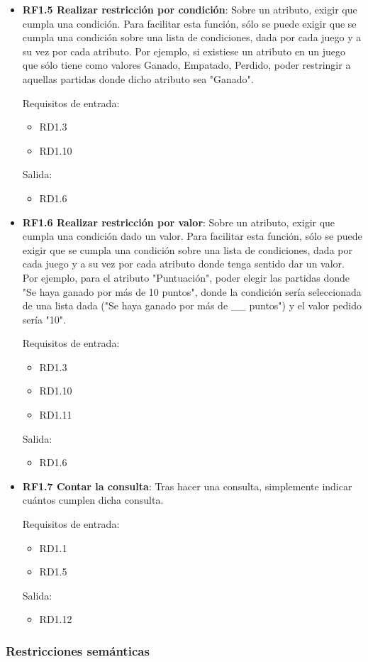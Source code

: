 \begin{itemize}
	
	\item \textbf{RF1.5 Realizar restricción por condición}: Sobre un atributo, exigir que cumpla una condición. Para facilitar esta función, sólo se puede exigir que se cumpla una condición sobre una lista de condiciones, dada por cada juego y a su vez por cada atributo. Por ejemplo, si existiese un atributo en un juego que sólo tiene como valores {Ganado, Empatado, Perdido}, poder restringir a aquellas partidas donde dicho atributo sea "Ganado".
	
	Requisitos de entrada:
	\begin{itemize}
		\item RD1.3
		\item RD1.10
	\end{itemize}
	Salida:
	\begin{itemize}
		\item RD1.6
	\end{itemize}
	
	
	\item \textbf{RF1.6 Realizar restricción por valor}: Sobre un atributo, exigir que cumpla una condición dado un valor. Para facilitar esta función, sólo se puede exigir que se cumpla una condición sobre una lista de condiciones, dada por cada juego y a su vez por cada atributo donde tenga sentido dar un valor. Por ejemplo, para el atributo "Puntuación", poder elegir las partidas donde "Se haya ganado por más de 10 puntos", donde la condición sería seleccionada de una lista dada ("Se haya ganado por más de \_\_ puntos") y el valor pedido sería "10".
	
	Requisitos de entrada:
	\begin{itemize}
		\item RD1.3
		\item RD1.10
		\item RD1.11
	\end{itemize}
	Salida:
	\begin{itemize}
		\item RD1.6
	\end{itemize}
	
	
	\item \textbf{RF1.7 Contar la consulta}: Tras hacer una consulta, simplemente indicar cuántos cumplen dicha consulta.
	
	Requisitos de entrada:
	\begin{itemize}
		\item RD1.1
		\item RD1.5
	\end{itemize}
	Salida:
	\begin{itemize}
		\item RD1.12
	\end{itemize}
\end{itemize}

\subsubsection{Restricciones semánticas}
